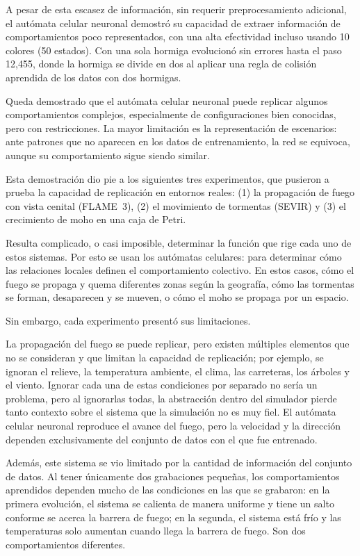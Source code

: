 A pesar de esta escasez de información, sin requerir preprocesamiento adicional, el autómata celular neuronal demostró su capacidad de extraer información de comportamientos poco representados, con una alta efectividad incluso usando 10 colores (50 estados). Con una sola hormiga evolucionó sin errores hasta el paso 12,455, donde la hormiga se divide en dos al aplicar una regla de colisión aprendida de los datos con dos hormigas.

Queda demostrado que el autómata celular neuronal puede replicar algunos comportamientos complejos, especialmente de configuraciones bien conocidas, pero con restricciones. La mayor limitación es la representación de escenarios: ante patrones que no aparecen en los datos de entrenamiento, la red se equivoca, aunque su comportamiento sigue siendo similar.

Esta demostración dio pie a los siguientes tres experimentos, que pusieron a prueba la capacidad de replicación en entornos reales: (1) la propagación de fuego con vista cenital (FLAME~3), (2) el movimiento de tormentas (SEVIR) y (3) el crecimiento de moho en una caja de Petri.

Resulta complicado, o casi imposible, determinar la función que rige cada uno de estos sistemas. Por esto se usan los autómatas celulares: para determinar cómo las relaciones locales definen el comportamiento colectivo. En estos casos, cómo el fuego se propaga y quema diferentes zonas según la geografía, cómo las tormentas se forman, desaparecen y se mueven, o cómo el moho se propaga por un espacio.

Sin embargo, cada experimento presentó sus limitaciones.

La propagación del fuego se puede replicar, pero existen múltiples elementos que no se consideran y que limitan la capacidad de replicación; por ejemplo, se ignoran el relieve, la temperatura ambiente, el clima, las carreteras, los árboles y el viento. Ignorar cada una de estas condiciones por separado no sería un problema, pero al ignorarlas todas, la abstracción dentro del simulador pierde tanto contexto sobre el sistema que la simulación no es muy fiel. El autómata celular neuronal reproduce el avance del fuego, pero la velocidad y la dirección dependen exclusivamente del conjunto de datos con el que fue entrenado.

Además, este sistema se vio limitado por la cantidad de información del conjunto de datos. Al tener únicamente dos grabaciones pequeñas, los comportamientos aprendidos dependen mucho de las condiciones en las que se grabaron: en la primera evolución, el sistema se calienta de manera uniforme y tiene un salto conforme se acerca la barrera de fuego; en la segunda, el sistema está frío y las temperaturas solo aumentan cuando llega la barrera de fuego. Son dos comportamientos diferentes.

